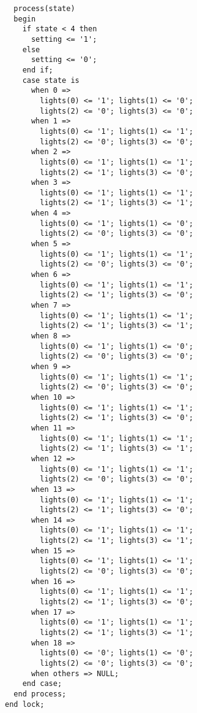 \documentclass[a4paper]{article}
\begin{document}
\begin{lstlisting}
  process(state)
  begin
    if state < 4 then
      setting <= '1';
    else
      setting <= '0';
    end if;
    case state is
      when 0 => 
        lights(0) <= '1'; lights(1) <= '0'; 
        lights(2) <= '0'; lights(3) <= '0';
      when 1 => 
        lights(0) <= '1'; lights(1) <= '1'; 
        lights(2) <= '0'; lights(3) <= '0';
      when 2 => 
        lights(0) <= '1'; lights(1) <= '1'; 
        lights(2) <= '1'; lights(3) <= '0';
      when 3 => 
        lights(0) <= '1'; lights(1) <= '1'; 
        lights(2) <= '1'; lights(3) <= '1';
      when 4 => 
        lights(0) <= '1'; lights(1) <= '0'; 
        lights(2) <= '0'; lights(3) <= '0';
      when 5 => 
        lights(0) <= '1'; lights(1) <= '1'; 
        lights(2) <= '0'; lights(3) <= '0';
      when 6 => 
        lights(0) <= '1'; lights(1) <= '1'; 
        lights(2) <= '1'; lights(3) <= '0';
      when 7 => 
        lights(0) <= '1'; lights(1) <= '1'; 
        lights(2) <= '1'; lights(3) <= '1';
      when 8 => 
        lights(0) <= '1'; lights(1) <= '0'; 
        lights(2) <= '0'; lights(3) <= '0';
      when 9 => 
        lights(0) <= '1'; lights(1) <= '1'; 
        lights(2) <= '0'; lights(3) <= '0';
      when 10 => 
        lights(0) <= '1'; lights(1) <= '1'; 
        lights(2) <= '1'; lights(3) <= '0';
      when 11 => 
        lights(0) <= '1'; lights(1) <= '1'; 
        lights(2) <= '1'; lights(3) <= '1';
      when 12 => 
        lights(0) <= '1'; lights(1) <= '1'; 
        lights(2) <= '0'; lights(3) <= '0';
      when 13 => 
        lights(0) <= '1'; lights(1) <= '1'; 
        lights(2) <= '1'; lights(3) <= '0';
      when 14 => 
        lights(0) <= '1'; lights(1) <= '1'; 
        lights(2) <= '1'; lights(3) <= '1';
      when 15 => 
        lights(0) <= '1'; lights(1) <= '1'; 
        lights(2) <= '0'; lights(3) <= '0';
      when 16 => 
        lights(0) <= '1'; lights(1) <= '1'; 
        lights(2) <= '1'; lights(3) <= '0';
      when 17 => 
        lights(0) <= '1'; lights(1) <= '1'; 
        lights(2) <= '1'; lights(3) <= '1';
      when 18 => 
        lights(0) <= '0'; lights(1) <= '0'; 
        lights(2) <= '0'; lights(3) <= '0';
      when others => NULL;
    end case;
  end process;
end lock;
    \end{lstlisting}
\end{document}

